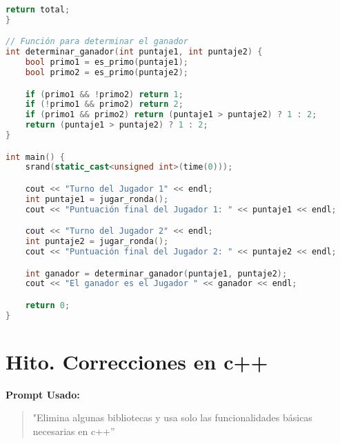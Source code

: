 \documentclass{article}
\begin{document}
\begin{lstlisting}[language=C++, Caption=Código en C++]
    return total;
}

// Función para determinar el ganador
int determinar_ganador(int puntaje1, int puntaje2) {
    bool primo1 = es_primo(puntaje1);
    bool primo2 = es_primo(puntaje2);

    if (primo1 && !primo2) return 1;
    if (!primo1 && primo2) return 2;
    if (primo1 && primo2) return (puntaje1 > puntaje2) ? 1 : 2;
    return (puntaje1 > puntaje2) ? 1 : 2;
}

int main() {
    srand(static_cast<unsigned int>(time(0)));

    cout << "Turno del Jugador 1" << endl;
    int puntaje1 = jugar_ronda();
    cout << "Puntuación final del Jugador 1: " << puntaje1 << endl;

    cout << "Turno del Jugador 2" << endl;
    int puntaje2 = jugar_ronda();
    cout << "Puntuación final del Jugador 2: " << puntaje2 << endl;

    int ganador = determinar_ganador(puntaje1, puntaje2);
    cout << "El ganador es el Jugador " << ganador << endl;

    return 0;
}

\end{lstlisting}
\section{Hito. Correcciones en c++}


\textbf{Prompt Usado:}

\begin{quote}
"Elimina algunas bibliotecas y usa solo las funcionalidades básicas necesarias en c++”
\end{quote}
\end{document}
